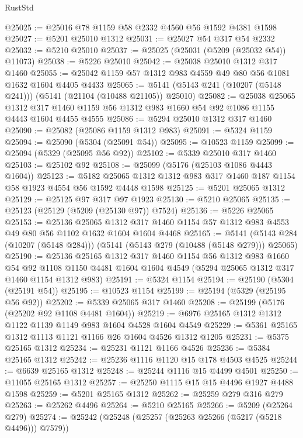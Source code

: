 \begin{lexlean}{RustStd}
\begin{coremodule}
@25025 := @25016 @78 @1159 @58 @2332 @4560 @56 @1592 @4381 @1598
@25027 := @5201 @25010 @1312
@25031 := @25027 @54 @317 @54 @2332
@25032 := @5210 @25010
@25037 := @25025 (@25031 (@5209 (@25032 @54)) @11073)
@25038 := @5226 @25010
@25042 := @25038 @25010 @1312 @317 @1460
@25055 := @25042 @1159 @57 @1312 @983 @4559 @49 @80 @56 @1081 @1632 @1604 @4405 @4433
@25065 := @5141 (@5143 @241 (@10207 (@5148 @241))) (@5141 (@21104 (@10488 @21105)) @25010)
@25082 := @25038
    @25065
    @1312
    @317
    @1460
    @1159
    @56
    @1312
    @983
    @1660
    @54
    @92
    @1086
    @1155
    @4443
    @1604
    @4455
    @4555
@25086 := @5294 @25010 @1312 @317 @1460
@25090 := @25082 (@25086 @1159 @1312 @983)
@25091 := @5324 @1159
@25094 := @25090 (@5304 (@25091 @54))
@25095 := @10523 @1159
@25099 := @25094 (@5329 (@25095 @56 @92))
@25102 := @5339 @25010 @317 @1460
@25103 := @25102 @92
@25108 := @25099 (@5176 (@25103 @1086 @4443 @1604))
@25123 := @5182 @25065 @1312 @1312 @983 @317 @1460 @187 @1154 @58 @1923 @4554 @56 @1592 @4448 @1598
@25125 := @5201 @25065 @1312
@25129 := @25125 @97 @317 @97 @1923
@25130 := @5210 @25065
@25135 := @25123 (@25129 (@5209 (@25130 @97)) @7524)
@25136 := @5226 @25065
@25153 := @25136
    @25065
    @1312
    @317
    @1460
    @1154
    @57
    @1312
    @983
    @4553
    @49
    @80
    @56
    @1102
    @1632
    @1604
    @1604
    @4468
@25165 := @5141 (@5143 @284 (@10207 (@5148 @284))) (@5141 (@5143 @279 (@10488 (@5148 @279))) @25065)
@25190 := @25136
    @25165
    @1312
    @317
    @1460
    @1154
    @56
    @1312
    @983
    @1660
    @54
    @92
    @1108
    @1150
    @4481
    @1604
    @1604
    @4549
    (@5294 @25065 @1312 @317 @1460 @1154 @1312 @983)
@25191 := @5324 @1154
@25194 := @25190 (@5304 (@25191 @54))
@25195 := @10523 @1154
@25199 := @25194 (@5329 (@25195 @56 @92))
@25202 := @5339 @25065 @317 @1460
@25208 := @25199 (@5176 (@25202 @92 @1108 @4481 @1604))
@25219 := @6976 @25165 @1312 @1312 @1122 @1139 @1149 @983 @1604 @4528 @1604 @4549
@25229 := @5361 @25165 @1312 @1113 @1121 @1166 @26 @1604 @4526 @1312 @1205
@25231 := @5375 @25165 @1312
@25234 := @25231 @1121 @1166 @4526
@25236 := @5384 @25165 @1312
@25242 := @25236 @1116 @1120 @15 @178 @4503 @4525
@25244 := @6639 @25165 @1312
@25248 := @25244 @1116 @15 @4499 @4501
@25250 := @11055 @25165 @1312
@25257 := @25250 @1115 @15 @15 @4496 @1927 @4488 @1598
@25259 := @5201 @25165 @1312
@25262 := @25259 @279 @316 @279
@25263 := @25262 @4496
@25264 := @5210 @25165
@25266 := @5209 (@25264 @279)
@25274 := @25242 (@25248 (@25257 (@25263 @25266 (@5217 (@5218 @4496))) @7579))

\end{coremodule}
\end{lexlean}

